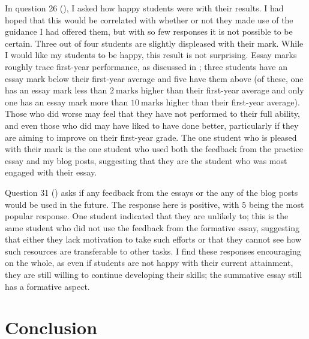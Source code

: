 In question 26 (), I asked how happy students were with their results. I had hoped that this would be correlated with whether or not they made use of the guidance I had offered them, but with so few responses it is not possible to be certain. Three out of four students are slightly displeased with their mark. While I would like my students to be happy, this result is not surprising. Essay marks roughly trace first-year performance, as discussed in ; three students have an essay mark below their first-year average and five have them above (of these, one has an essay mark less than $2~\mathrm{marks}$ higher than their first-year average and only one has an essay mark more than $10~\mathrm{marks}$ higher than their first-year average). Those who did worse may feel that they have not performed to their full ability, and even those who did may have liked to have done better, particularly if they are aiming to improve on their first-year grade. The one student who is pleased with their mark is the one student who used both the feedback from the practice essay and my blog posts, suggesting that they are the student who was most engaged with their essay.

Question 31 () asks if any feedback from the essays or the any of the blog posts would be used in the future. The response here is positive, with $5$ being the most popular response. One student indicated that they are unlikely to; this is the same student who did not use the feedback from the formative essay, suggesting that either they lack motivation to take such efforts or that they cannot see how such resources are transferable to other tasks. I find these responses encouraging on the whole, as even if students are not happy with their current attainment, they are still willing to continue developing their skills; the summative essay still has a formative aspect.

\section{Conclusion}\label{sec:student-conc}

